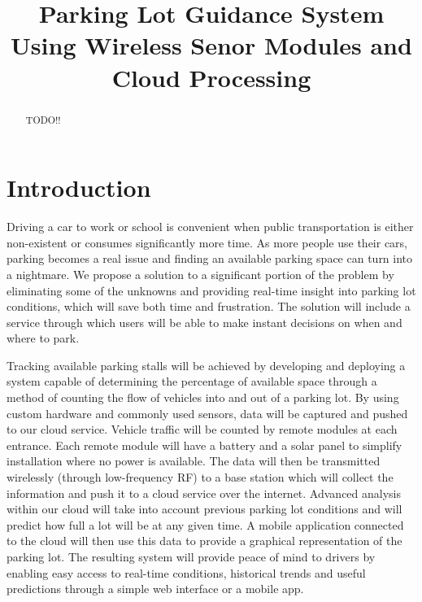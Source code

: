 \documentclass[letterpaper,10 pt,conference,onecolumn]{IEEEtran}
\begin{document}
	\title{
		Parking Lot Guidance System Using Wireless Senor Modules and Cloud Processing
	}

	\author{
	}

	\maketitle
	
	
	\begin{abstract}
	TODO!!
	\end{abstract}

	
	\section{Introduction}
		Driving a car to work or school is convenient when public transportation is either non-existent or consumes significantly more time. As more people use their cars, parking becomes a real issue and finding an available parking space can turn into a nightmare. We propose a solution to a significant portion of the problem by eliminating some of the unknowns and providing real-time insight into parking lot conditions, which will save both time and frustration. The solution will include a service through which users will be able to make instant decisions on when and where to park.
		
		Tracking available parking stalls will be achieved by developing and deploying a system capable of determining the percentage of available space through a method of counting the flow of vehicles into and out of a parking lot. By using custom hardware and commonly used sensors, data will be captured and pushed to our cloud service. Vehicle traffic will be counted by remote modules at each entrance. Each remote module will have a battery and a solar panel to simplify installation where no power is available. The data will then be transmitted wirelessly (through low-frequency RF) to a base station which will collect the information and push it to a cloud service over the internet. Advanced analysis within our cloud will take into account previous parking lot conditions and will predict how full a lot will be at any given time. A mobile application connected to the cloud will then use this data to provide a graphical representation of the parking lot. The resulting system will provide peace of mind to drivers by enabling easy access to real-time conditions, historical trends and useful predictions through a simple web interface or a mobile app.
		
\end{document}
